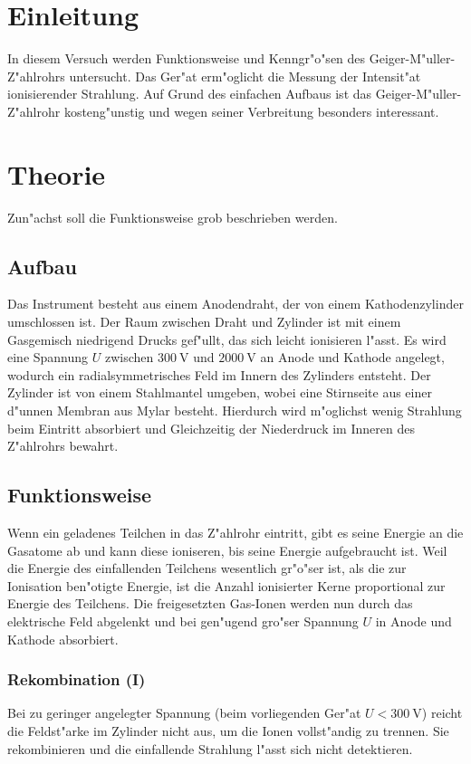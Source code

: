 \section{Einleitung} %
\label{sec:einleitung}
	In diesem Versuch werden Funktionsweise und Kenngr"o"sen des Geiger-M"uller-Z"ahlrohrs untersucht.
	Das Ger"at erm"oglicht die Messung der Intensit"at ionisierender Strahlung.
	Auf Grund des einfachen Aufbaus ist das Geiger-M"uller-Z"ahlrohr kosteng"unstig und wegen seiner Verbreitung besonders interessant.

\section{Theorie} %
\label{sec:theorie}
	Zun"achst soll die Funktionsweise grob beschrieben werden.

	\subsection{Aufbau}
	\label{subsec:aufbau}
		Das Instrument besteht aus einem Anodendraht, der von einem Kathodenzylinder umschlossen ist.
		Der Raum zwischen Draht und Zylinder ist mit einem Gasgemisch niedrigend Drucks gef"ullt, das sich leicht ionisieren l"asst.
		Es wird eine Spannung $U$ zwischen $\SI{300}{\volt}$ und $\SI{2000}{\volt}$ an Anode und Kathode angelegt, wodurch ein radialsymmetrisches Feld im Innern des Zylinders entsteht.
		Der Zylinder ist von einem Stahlmantel umgeben, wobei eine Stirnseite aus einer d"unnen Membran aus Mylar besteht.
		Hierdurch wird m"oglichst wenig Strahlung beim Eintritt absorbiert und Gleichzeitig der Niederdruck im Inneren des Z"ahlrohrs bewahrt.

	\subsection{Funktionsweise}
	\label{subsec:funktionsweise}
		Wenn ein geladenes Teilchen in das Z"ahlrohr eintritt, gibt es seine Energie an die Gasatome ab und kann diese ioniseren, bis seine Energie aufgebraucht ist.
		Weil die Energie des einfallenden Teilchens wesentlich gr"o"ser ist, als die zur Ionisation ben"otigte Energie, ist die Anzahl ionisierter Kerne proportional zur Energie des Teilchens.
		Die freigesetzten Gas-Ionen werden nun durch das elektrische Feld abgelenkt und bei gen"ugend gro"ser Spannung $U$ in Anode und Kathode absorbiert.

		\subsubsection{Rekombination (I)}
		\label{subsubsec:rekombination}
			Bei zu geringer angelegter Spannung (beim vorliegenden Ger"at $U < \SI{300}{\volt}$) reicht die Feldst"arke im Zylinder nicht aus, um die Ionen vollst"andig zu trennen.
			Sie rekombinieren und die einfallende Strahlung l"asst sich nicht detektieren.

